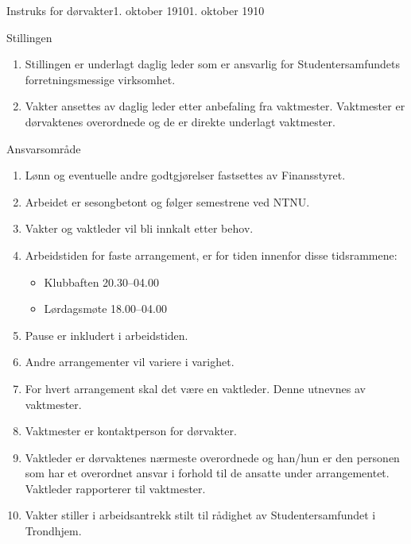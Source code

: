 \begin{instruks}{Instruks for dørvakter}{1. oktober 1910}{1. oktober 1910}
    \begin{instruksledd}{Stillingen}
    \begin{enumerate}
    \item Stillingen er underlagt daglig leder som er ansvarlig for Studentersamfundets forretningsmessige virksomhet.
    \item Vakter ansettes av daglig leder etter anbefaling fra vaktmester. Vaktmester er dørvaktenes overordnede og de er direkte underlagt vaktmester.
    \end{enumerate}    
    \end{instruksledd}

    \begin{instruksledd}{Ansvarsområde}
    \begin{enumerate}
    \item Lønn og eventuelle andre godtgjørelser fastsettes av Finansstyret.
    \item Arbeidet er sesongbetont og følger semestrene ved NTNU.
    \item Vakter og vaktleder vil bli innkalt etter behov.
    \item Arbeidstiden for faste arrangement, er for tiden innenfor disse tidsrammene:
        \begin{itemize}
	      \item Klubbaften 20.30--04.00
	      \item Lørdagsmøte 18.00--04.00
        \end{itemize}
    \item Pause er inkludert i arbeidstiden.
    \item Andre arrangementer vil variere i varighet.
    \item For hvert arrangement skal det være en vaktleder. Denne utnevnes av vaktmester.
    \item Vaktmester er kontaktperson for dørvakter.
    \item Vaktleder er dørvaktenes nærmeste overordnede og han/hun er den personen som har et overordnet ansvar i
forhold til de ansatte under arrangementet. Vaktleder rapporterer til vaktmester.
    \item Vakter stiller i arbeidsantrekk stilt til rådighet av Studentersamfundet i Trondhjem.
    \end{enumerate}    
    \end{instruksledd}


\end{instruks}
